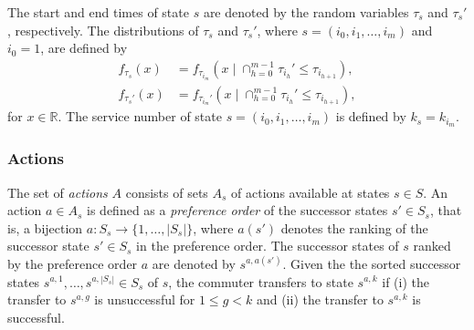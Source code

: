 \documentclass[dissertation,draft*]{aaltoseries}
\begin{document}
The start and end times of state $s$ are denoted by the random variables $\tau_s$ and $\tau_s'$, respectively.
The distributions of $\tau_s$ and $\tau_s'$, where $s=(i_0,i_1,\ldots,i_m)$ and $i_0=1$, are defined by
\begin{align}
\label{ehdollinen1}
f_{\tau_s }(x) &= f_{\tau_{i_m}} (x  \mid \cap_{h=0}^{m-1} \tau_{i_h}' \leq \tau_{i_{h+1}} ), \\
\label{ehdollinen2}
f_{\tau_s'}(x) &= f_{\tau_{i_m}'}(x \mid  \cap_{h=0}^{m-1} \tau_{i_h}' \leq \tau_{i_{h+1}} ),
\end{align}
for $x \in \mathbb{R}$.
The service number of state $s=(i_0,i_1,\ldots,i_m)$ is defined by $k_s = k_{i_m}$.

\subsubsection{Actions}
\label{actionsdef}
The set of \emph{actions} $A$ consists of sets $A_s$ of actions available at states $s \in S$.
An action $a \in A_s$ is defined as a \emph{preference order} of the successor states $s' \in S_s$, 
that is, a bijection $a:S_s \to \{1,\ldots,|S_s|\}$, where $a(s')$ denotes the ranking of the successor state $s' \in S_s$
in the preference order. The successor states of $s$ ranked by the preference order $a$ are denoted by $s^{a,a(s')}$.
Given the the sorted successor states $s^{a,1}, \ldots, s^{a,|S_s|} \in S_{s}$ of $s$, 
the commuter transfers to state $s^{a,k}$ if 
(i) the transfer to $s^{a,g}$ is unsuccessful for $1 \leq g < k$ and 
(ii) the transfer to $s^{a,k}$ is successful.
\end{document}
